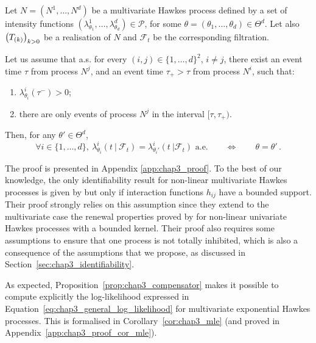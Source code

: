 \begin{theorem}[Identifiability]\label{th:chap3_identifiability}
    Let $N=(N^1, \ldots, N^d)$ be a multivariate Hawkes process defined by a set of intensity functions $(\lambda^1_{\theta_1}, \dots, \lambda^d_{\theta_d}) \in \mathcal P$, for some $\theta = (\theta_1, \dots, \theta_d) \in \Theta^d$.
    Let also $\left(T_{(k)} \right)_{k>0}$ be a realisation of $N$ and $\mathcal{F}_t$ be the corresponding filtration.
    
    Let us assume that a.s. for every $(i, j) \in \{1, \dots, d\}^2$, $i\neq j$,
    there exist an event time \(\tau\) from process \(N^j\),
    and an event time \(\tau_+ > \tau\) from process \(N^i\), such that:
    \begin{enumerate}
        \item \label{hyp:chap3_ii} $\lambda_{\theta_i}^i(\tau^-) > 0$;
        \item \label{hyp:chap3_iii} there are only events of process $N^j$ in the interval $[\tau, \tau_+)$.
    \end{enumerate} 
    
    Then, for any $\theta' \in \Theta^d$,
    \[
      \forall i \in \{1, \dots, d\},~
      \lambda_{\theta_i}^i(t ~|~ \mathcal{F}_t) = \lambda_{\theta_i'}^i(t ~| \mathcal{F}_t) \text{ a.e.}
      \qquad
      \iff
      \qquad
      \theta = \theta' \,.
    \]
\end{theorem}

The proof is presented in Appendix \ref{app:chap3_proof}. To the best of our knowledge, the only identifiability result for non-linear multivariate Hawkes processes is given by \textcite{Sulem2024} but only if interaction functions $h_{ij}$ have a bounded support. Their proof strongly relies on this assumption since they extend to the multivariate case the renewal properties proved by \textcite{Costa2020} for non-linear univariate Hawkes processes with a bounded kernel.
Their proof also requires some assumptions to ensure that one process is not totally inhibited, which is also a consequence of the assumptions that we propose, as discussed in Section~\ref{sec:chap3_identifiability}. 

    As expected, Proposition~\ref{prop:chap3_compensator} makes it possible to compute explicitly the log-likelihood expressed in Equation~\eqref{eq:chap3_general_log_likelihood} for multivariate exponential Hawkes processes.
    This is formalised in Corollary~\ref{cor:chap3_mle} (and proved in Appendix~\ref{app:chap3_proof_cor_mle}).

